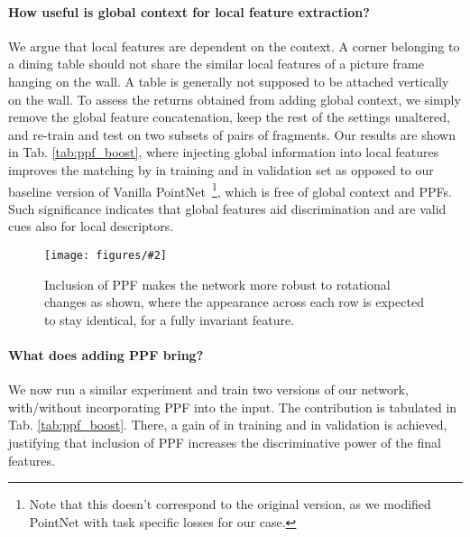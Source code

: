 \documentclass[10pt,twocolumn,letterpaper]{article}
\theoremstyle{break}
\newcommand{\insertimageC}[5]{ \begin{figure}[#5]
\centering
\texttt{[image: figures/\#2]}
\caption{#3}
\label{#4}
\vspace{-2mm}
\end{figure}
}
\begin{document}
\paragraph{How useful is global context for local feature extraction?} We argue that local features are dependent on the context. A corner belonging to a dining table should not share the similar local features of a picture frame hanging on the wall. A table is generally not supposed to be attached vertically on the wall. To assess the returns obtained from adding global context, we simply remove the global feature concatenation, keep the rest of the settings unaltered, and re-train and test on two subsets of pairs of fragments. Our results are shown in Tab. \ref{tab:ppf_boost}, where injecting global information into local features improves the matching by  in training and  in validation set as opposed to our baseline version of Vanilla PointNet~\footnote{Note that this doesn't  correspond to the original version, as we modified PointNet with task specific losses for our case.}, which is free of global context and PPFs. Such significance indicates that global features aid discrimination and are valid cues also for local descriptors.
\insertimageC{1}{ppf_rotation2c_cropped.pdf}{Inclusion of PPF makes the network more robust to rotational changes as shown, where the appearance across each row is expected to stay identical, for a fully invariant feature.}{fig:ppf_rotation}{t!}
\vspace{-5mm}
\paragraph{What does adding PPF bring?}
We now run a similar experiment and train two versions of our network, with/without incorporating PPF into the input. The contribution is tabulated in Tab. \ref{tab:ppf_boost}. There, a gain of  in training and  in validation is achieved, justifying that inclusion of PPF increases the discriminative power of the final features. 
\end{document}

